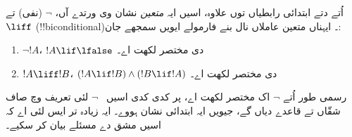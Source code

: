 \documentclass[../../../include/open-logic-section]{subfiles}
\begin{document}
اُتے دتے ابتدائی رابطیاں توں علاوہ، اسیں ایہ \emph{متعین} نشان
وی ورتدے آں، $\lnot$ (نفی) تے $\liff$ (!!{biconditional})۔
ایہناں متعین عاملاں نال بنے فارمولے ایویں سمجھے جان:
\begin{enumerate}
\item $\lnot !A$، $!A \lif \lfalse$ دی مختصر لکھت اے۔

\item $!A \liff !B$، $(!A \lif !B) \land (!B
  \lif !A)$ دی مختصر لکھت اے۔
\end{enumerate}

رسمی طور اُتے $\lnot$ اک مختصر لکھت اے، پر کدی کدی اسیں
~$\lnot$ لئی تعریف وچ صاف شقّاں تے قاعدے دیاں گے، جیویں ایہ
ابتدائی نشان ہووے۔ ایہ زیادہ تر ایس لئی اے کہ اسیں مشق دے
مسئلے بیان کر سکیے۔
\end{document}
